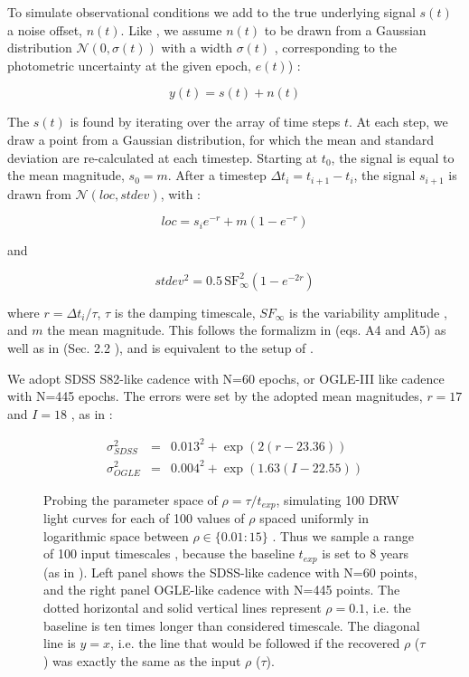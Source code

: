 \documentclass[twocolumn]{aastex62}
\begin{document}
To simulate observational conditions  we add to the true underlying signal  $s(t)$ a noise offset, $n(t)$.  Like \cite{kozlowski2017a},  we assume $n(t)$ to be drawn from a Gaussian distribution $\mathcal{N}(0,\sigma(t))$ with a width $\sigma(t)$ , corresponding to the  photometric uncertainty at the given epoch,  $e(t)$) : 

\begin{equation}
y(t) = s(t) + n(t) 
\end{equation}

The $s(t)$ is found by iterating over the array of time steps $t$.  At each step, we draw a point from a Gaussian distribution, for which the mean and standard deviation are re-calculated at each timestep. Starting at $t_{0}$, the signal is equal to the mean magnitude, $s_{0} = m$. After a timestep $\Delta t_{i} = t_{i+1} - t_{i}$, the signal $s_{i+1}$ is drawn from  $\mathcal{N}(loc, stdev)$, with : 

\begin{equation}
loc = s_{i} e ^ { - r  }  + m \left( 1 - e ^{ - r }\right)
\end{equation}

and 

\begin{equation}
stdev^{2} =  0.5  \, \mathrm{SF}_{\infty}^{2} \left( 1 - e ^{  - 2 r  }  \right)
\end{equation}

where  $r = \Delta t_{i} / \tau$, $\tau$ is the damping timescale,   $SF_{\infty}$ is the  variability amplitude , and $m$ the mean magnitude.  This follows the formalizm in \cite{kelly2009} (eqs. A4 and A5) as well as in \cite{macleod2010} (Sec. 2.2 ), and is equivalent to the setup of  \cite{kozlowski2017a}. 


We adopt SDSS S82-like cadence with N=60 epochs, or OGLE-III like cadence with N=445 epochs.  The errors were set by the adopted mean magnitudes, $r=17$ and $I=18$ , as in \cite{kozlowski2017a} :

\begin{eqnarray}
\sigma_{SDSS}^{2} &=& 0.013^{2} + \exp{(2 (r-23.36))} \\
\sigma_{OGLE}^{2} &=& 0.004^{2} + \exp{(1.63 (I - 22.55))}
\end{eqnarray}


\begin{figure*}
\caption{Probing the parameter space of $\rho = \tau / t_{exp}$, simulating 100 DRW light curves for each of 100 values of $\rho$ spaced uniformly in logarithmic space between $\rho \in   \{ 0.01 : 15\}$ . Thus we sample a range of 100 input timescales , because the baseline $t_{exp}$ is set to 8 years (as in \citet{kozlowski2017a}). Left panel shows the SDSS-like cadence with N=60 points, and the right panel OGLE-like cadence with N=445 points. The dotted horizontal and solid vertical lines represent $\rho = 0.1$, i.e. the baseline is ten times longer than considered timescale. The diagonal line is $y=x$, i.e. the line that would be followed if the recovered  $\rho$ ($\tau$) was exactly the same as  
the input $\rho$ ($\tau$).} 
\label{fig:Fig2kozlowski}
\end{figure*}
\end{document}
